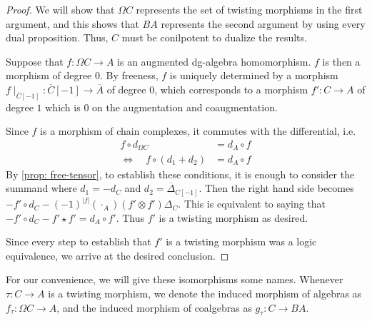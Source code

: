 \documentclass[../thesis.tex]{subfiles}
\begin{document}
            \begin{proof}
                We will show that $\Omega C$ represents the set of twisting morphisms in the first argument, and this shows that $BA$ represents the second argument by using every dual proposition. Thus, $C$ must be conilpotent to dualize the results.

                Suppose that $f:\Omega C \rightarrow A$ is an augmented dg-algebra homomorphism. $f$ is then a morphism of degree $0$. By freeness, $f$ is uniquely determined by a morphism $f\mid_{\overline{C}[-1]}:\overline{C}[-1]\rightarrow \overline{A}$ of degree $0$, which corresponds to a morphism $f':C\rightarrow A$ of degree $1$ which is $0$ on the augmentation and coaugmentation. 

                Since $f$ is a morphism of chain complexes, it commutes with the differential, i.e. 
                \begin{align*}
                    f\circ d_{\Omega C} & = d_A\circ f \\
                    \Leftrightarrow\quad f\circ (d_1 + d_2) & = d_A\circ f 
                \end{align*}
                By \ref{prop: free-tensor}, to establish these conditions, it is enough to consider the summand where $d_1 = -d_C$ and $d_2 = \overline{\Delta}_{C[-1]}$. Then the right hand side becomes $-f' \circ d_C - (-1)^{|f|}(\cdot_A)(f' \otimes f')\Delta_C$. This is equivalent to saying that $-f'\circ d_C - f'\star f' = d_A\circ f'$. Thus $f'$ is a twisting morphism as desired.

                Since every step to establish that $f'$ is a twisting morphism was a logic equivalence, we arrive at the desired conclusion.
            \end{proof}

            For our convenience, we will give these isomorphisms some names. Whenever $\tau: C \rightarrow A$ is a twisting morphism, we denote the induced morphism of algebras as $f_\tau: \Omega C \rightarrow A$, and the induced morphism of coalgebras as $g_\tau: C \rightarrow BA$.
\end{document}
